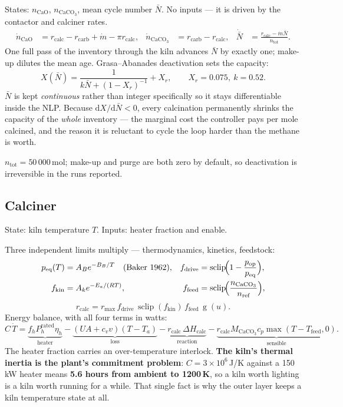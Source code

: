 \documentclass[11pt,a4paper]{article}
\newcommand{\sclip}{\operatorname{sclip}}
\newcommand{\gate}{\operatorname{g}}
\begin{document}
States: $n_{\mathrm{CaO}}$, $n_{\mathrm{CaCO_3}}$, mean cycle number $\bar N$.
No inputs --- it is driven by the contactor and calciner rates.
\begin{align}
\dot n_{\mathrm{CaO}} &= r_{\text{calc}} - r_{\text{carb}} + \dot m - \pi r_{\text{calc}}, &
\dot n_{\mathrm{CaCO_3}} &= r_{\text{carb}} - r_{\text{calc}}, &
\dot{\bar N} &= \frac{r_{\text{calc}} - \dot m \bar N}{n_{\text{tot}}} .
\end{align}
One full pass of the inventory through the kiln advances $\bar N$ by exactly one;
make-up dilutes the mean age. Grasa--Abanades deactivation sets the capacity:
\begin{equation}
X(\bar N) = \frac{1}{k\bar N + (1-X_r)^{-1}} + X_r,
\qquad X_r = 0.075,\ k = 0.52 .
\end{equation}
$\bar N$ is kept \emph{continuous} rather than integer specifically so it stays
differentiable inside the NLP. Because $\mathrm{d}X/\mathrm{d}\bar N<0$, every
calcination permanently shrinks the capacity of the \emph{whole} inventory ---
the marginal cost the controller pays per mole calcined, and the reason it is
reluctant to cycle the loop harder than the methane is worth.

$n_{\text{tot}} = 50\,000$\,mol; make-up and purge are both zero by default, so
deactivation is irreversible in the runs reported.

\subsection{Calciner}

State: kiln temperature $T$. Inputs: heater fraction and enable.

Three independent limits multiply --- thermodynamics, kinetics, feedstock:
\begin{align}
p_{\text{eq}}(T) &= A_B e^{-B_B/T} \quad\text{(Baker 1962)}, &
f_{\text{drive}} &= \sclip\!\Bigl(1-\frac{p_{\text{op}}}{p_{\text{eq}}}\Bigr), \\
f_{\text{kin}} &= A_k e^{-E_a/(RT)}, &
f_{\text{feed}} &= \sclip\!\Bigl(\frac{n_{\mathrm{CaCO_3}}}{n_{\text{ref}}}\Bigr),
\end{align}
\begin{equation}
r_{\text{calc}} = r_{\max}\,f_{\text{drive}}\,\sclip(f_{\text{kin}})\,f_{\text{feed}}\,\gate(u).
\end{equation}
Energy balance, with all four terms in watts:
\begin{equation}
C\,\dot T = \underbrace{f_h P_h^{\text{rated}}\eta_h}_{\text{heater}}
 - \underbrace{(UA + c_v v)(T-T_a)}_{\text{loss}}
 - \underbrace{r_{\text{calc}}\,\Delta H_{\text{calc}}}_{\text{reaction}}
 - \underbrace{r_{\text{calc}} M_{\mathrm{CaCO_3}} c_p \max(T-T_{\text{feed}},0)}_{\text{sensible}} .
\end{equation}
The heater fraction carries an over-temperature interlock. \textbf{The kiln's
thermal inertia is the plant's commitment problem}: $C = 3\times10^6$\,J/K
against a 150\,kW heater means \textbf{5.6 hours from ambient to 1200\,K}, so a
kiln worth lighting is a kiln worth running for a while. That single fact is why
the outer layer keeps a kiln temperature state at all.
\end{document}
